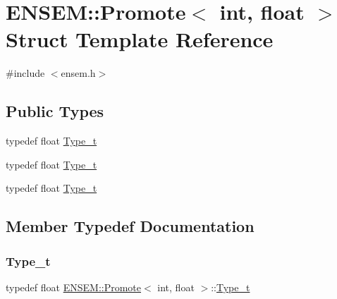 \hypertarget{structENSEM_1_1Promote_3_01int_00_01float_01_4}{}\section{E\+N\+S\+EM\+:\+:Promote$<$ int, float $>$ Struct Template Reference}
\label{structENSEM_1_1Promote_3_01int_00_01float_01_4}


{\ttfamily \#include $<$ensem.\+h$>$}

\subsection*{Public Types}
\begin{DoxyCompactItemize}
\item 
typedef float \mbox{\hyperlink{structENSEM_1_1Promote_3_01int_00_01float_01_4_af9c8f66593ece7d87835891df1c0d7e4}{Type\+\_\+t}}
\item 
typedef float \mbox{\hyperlink{structENSEM_1_1Promote_3_01int_00_01float_01_4_af9c8f66593ece7d87835891df1c0d7e4}{Type\+\_\+t}}
\item 
typedef float \mbox{\hyperlink{structENSEM_1_1Promote_3_01int_00_01float_01_4_af9c8f66593ece7d87835891df1c0d7e4}{Type\+\_\+t}}
\end{DoxyCompactItemize}


\subsection{Member Typedef Documentation}
\mbox{\label{structENSEM_1_1Promote_3_01int_00_01float_01_4_af9c8f66593ece7d87835891df1c0d7e4}} 
\subsubsection{\texorpdfstring{Type\_t}{Type\_t}\hspace{0.1cm}{\footnotesize\ttfamily [1/3]}}
{\footnotesize\ttfamily typedef float \mbox{\hyperlink{structENSEM_1_1Promote}{E\+N\+S\+E\+M\+::\+Promote}}$<$ int, float $>$\+::\mbox{\hyperlink{structENSEM_1_1Promote_3_01int_00_01float_01_4_af9c8f66593ece7d87835891df1c0d7e4}{Type\+\_\+t}}}

\mbox{\label{structENSEM_1_1Promote_3_01int_00_01float_01_4_af9c8f66593ece7d87835891df1c0d7e4}} 
